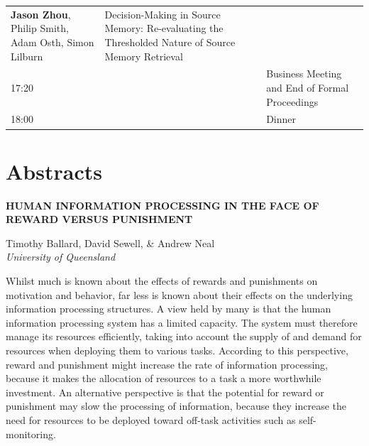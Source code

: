 \documentclass[]{article}
\begin{document}
\begin{longtable}[]{@{}lll@{}}
\begin{minipage}[t]{0.32\columnwidth}
\textbf{Jason Zhou}, Philip Smith, Adam Osth, Simon Lilburn\strut
\end{minipage} & \begin{minipage}[t]{0.57\columnwidth}\raggedright\strut
Decision-Making in Source Memory: Re-evaluating the Thresholded Nature
of Source Memory Retrieval\strut
\end{minipage}\tabularnewline
\begin{minipage}[t]{0.03\columnwidth}\raggedright\strut
17:20\strut
\end{minipage} & \begin{minipage}[t]{0.32\columnwidth}\raggedright\strut
\strut
\end{minipage} & \begin{minipage}[t]{0.57\columnwidth}\raggedright\strut
Business Meeting and End of Formal Proceedings\strut
\end{minipage}\tabularnewline
\begin{minipage}[t]{0.03\columnwidth}\raggedright\strut
18:00\strut
\end{minipage} & \begin{minipage}[t]{0.32\columnwidth}\raggedright\strut
\strut
\end{minipage} & \begin{minipage}[t]{0.57\columnwidth}\raggedright\strut
Dinner\strut
\end{minipage}\tabularnewline
\bottomrule
\end{longtable}

\pagebreak

\section{Abstracts}\label{abstracts}

\textbf{HUMAN INFORMATION PROCESSING IN THE FACE OF REWARD VERSUS
PUNISHMENT}

Timothy Ballard, David Sewell, \& Andrew Neal\\
\emph{University of Queensland}

Whilst much is known about the effects of rewards and punishments on
motivation and behavior, far less is known about their effects on the
underlying information processing structures. A view held by many is
that the human information processing system has a limited capacity. The
system must therefore manage its resources efficiently, taking into
account the supply of and demand for resources when deploying them to
various tasks. According to this perspective, reward and punishment
might increase the rate of information processing, because it makes the
allocation of resources to a task a more worthwhile investment. An
alternative perspective is that the potential for reward or punishment
may slow the processing of information, because they increase the need
for resources to be deployed toward off-task activities such as
self-monitoring.
\end{document}
